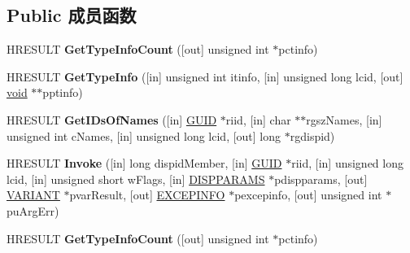 \subsection*{Public 成员函数}
\begin{DoxyCompactItemize}
\item 
\mbox{\label{interfacestdole_1_1_i_dispatch_a20c3d90919b4a8df42cfb5e4e32cd719}} 
H\+R\+E\+S\+U\+LT {\bfseries Get\+Type\+Info\+Count} (\mbox{[}out\mbox{]} unsigned int $\ast$pctinfo)
\item 
\mbox{\label{interfacestdole_1_1_i_dispatch_ae2a8afd9a1063e47d74500737cda73ce}} 
H\+R\+E\+S\+U\+LT {\bfseries Get\+Type\+Info} (\mbox{[}in\mbox{]} unsigned int itinfo, \mbox{[}in\mbox{]} unsigned long lcid, \mbox{[}out\mbox{]} \hyperlink{interfacevoid}{void} $\ast$$\ast$pptinfo)
\item 
\mbox{\label{interfacestdole_1_1_i_dispatch_afd06b18f7ca3f58d934c2e316a00446e}} 
H\+R\+E\+S\+U\+LT {\bfseries Get\+I\+Ds\+Of\+Names} (\mbox{[}in\mbox{]} \hyperlink{structstdole_1_1_g_u_i_d}{G\+U\+ID} $\ast$riid, \mbox{[}in\mbox{]} char $\ast$$\ast$rgsz\+Names, \mbox{[}in\mbox{]} unsigned int c\+Names, \mbox{[}in\mbox{]} unsigned long lcid, \mbox{[}out\mbox{]} long $\ast$rgdispid)
\item 
\mbox{\label{interfacestdole_1_1_i_dispatch_a42fe38ca49ec1ec2c7494388fed9cd52}} 
H\+R\+E\+S\+U\+LT {\bfseries Invoke} (\mbox{[}in\mbox{]} long dispid\+Member, \mbox{[}in\mbox{]} \hyperlink{structstdole_1_1_g_u_i_d}{G\+U\+ID} $\ast$riid, \mbox{[}in\mbox{]} unsigned long lcid, \mbox{[}in\mbox{]} unsigned short w\+Flags, \mbox{[}in\mbox{]} \hyperlink{structstdole_1_1_d_i_s_p_p_a_r_a_m_s}{D\+I\+S\+P\+P\+A\+R\+A\+MS} $\ast$pdispparams, \mbox{[}out\mbox{]} \hyperlink{interfacevoid}{V\+A\+R\+I\+A\+NT} $\ast$pvar\+Result, \mbox{[}out\mbox{]} \hyperlink{structstdole_1_1_e_x_c_e_p_i_n_f_o}{E\+X\+C\+E\+P\+I\+N\+FO} $\ast$pexcepinfo, \mbox{[}out\mbox{]} unsigned int $\ast$pu\+Arg\+Err)
\item 
\mbox{\label{interfacestdole_1_1_i_dispatch_a20c3d90919b4a8df42cfb5e4e32cd719}} 
H\+R\+E\+S\+U\+LT {\bfseries Get\+Type\+Info\+Count} (\mbox{[}out\mbox{]} unsigned int $\ast$pctinfo)
\item 

\end{DoxyCompactItemize}
